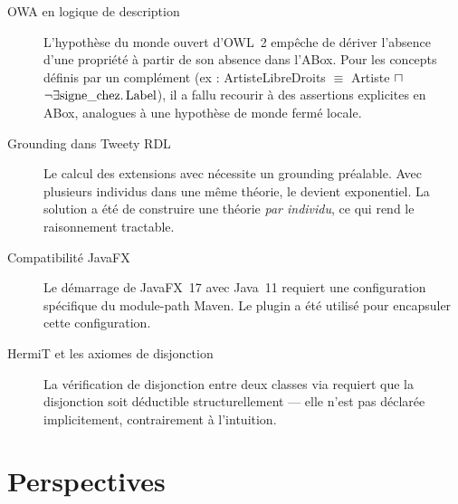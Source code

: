 \begin{description}
  \item[OWA en logique de description] L'hypothèse du monde ouvert d'OWL~2
        empêche de dériver l'absence d'une propriété à partir de son absence
        dans l'ABox. Pour les concepts définis par un complément (ex :
        ArtisteLibreDroits $\equiv$ Artiste $\sqcap$
        $\lnot \exists \text{signe\_chez}.\,\text{Label}$),
        il a fallu recourir à des assertions explicites en ABox, analogues à
        une hypothèse de monde fermé locale.

  \item[Grounding dans Tweety RDL] Le calcul des extensions avec
         nécessite un grounding préalable.
        Avec plusieurs individus dans une même théorie, le 
        devient exponentiel. La solution a été de construire une théorie
        \emph{par individu}, ce qui rend le raisonnement tractable.

  \item[Compatibilité JavaFX] Le démarrage de JavaFX~17 avec Java~11 requiert
        une configuration spécifique du module-path Maven.
        Le plugin  a été utilisé pour encapsuler
        cette configuration.

  \item[HermiT et les axiomes de disjonction] La vérification de disjonction
        entre deux classes via 
        requiert que la disjonction soit déductible structurellement — elle
        n'est pas déclarée implicitement, contrairement à l'intuition.
\end{description}

\section{Perspectives}


